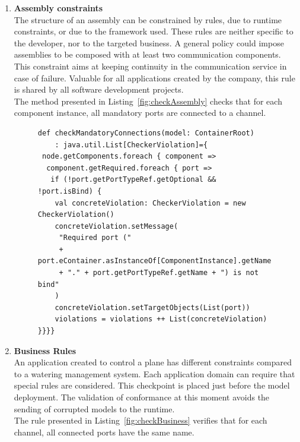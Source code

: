 \begin{enumerate}
\item {\bf Assembly constraints}\\
The structure of an assembly can be constrained by rules, due to runtime constraints, or due to the framework used. These rules are neither specific to the developer, nor to the targeted business. A general policy could impose assemblies to be composed with at least two communication components. This constraint aims at keeping continuity in the communication service in case of failure. Valuable for all applications created by the company, this rule is shared by all software development projects.\\
The method presented in Listing~\ref{fig:checkAssembly} checks that for each component instance, all mandatory ports are connected to a channel.

\begin{figure}[h!]
\centering
\begin{lstlisting}[caption=Example checking assembly constraints,label=fig:checkAssembly,basicstyle=\scriptsize\ttfamily,tabsize=1 ]
def checkMandatoryConnections(model: ContainerRoot)
	: java.util.List[CheckerViolation]={
 node.getComponents.foreach { component =>
  component.getRequired.foreach { port =>
   if (!port.getPortTypeRef.getOptional && !port.isBind) {
    val concreteViolation: CheckerViolation = new CheckerViolation()
    concreteViolation.setMessage(
     "Required port (" 
     + port.eContainer.asInstanceOf[ComponentInstance].getName
     + "." + port.getPortTypeRef.getName + ") is not bind"
    )
    concreteViolation.setTargetObjects(List(port))
    violations = violations ++ List(concreteViolation)
}}}}
\end{lstlisting} 
\vspace{-0,3cm}
\end{figure}


\item {\bf Business Rules}\\
An application created to control a plane has different constraints compared to a watering management system. Each application domain can require that special rules are considered. This checkpoint is placed just before the model deployment. The validation of conformance at this moment avoids the sending of corrupted models to the runtime.\\
The rule presented in Listing~\ref{fig:checkBusiness} verifies that for each channel, all connected ports have the same name.


\end{enumerate}
